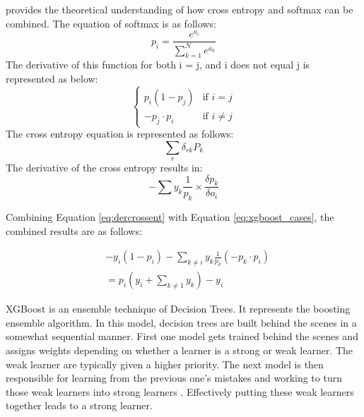\documentclass[stu,12pt,floatsintext]{apa7}
\begin{document}
\textcite{dahal2017softmax} provides the theoretical understanding of how cross entropy and softmax can be combined. The equation  of softmax is as follows:
\[
p_i = \frac{e^{a_i}}{\sum_{k=1}^N e^{a_k}}
\]
The derivative of this function for both i = j, and i does not equal j is represented as below:
\begin{equation}
\begin{cases}
p_i(1-p_j) & \text{if } i = j\\
-p_j \cdot p_i & \text{if } i \ne j
\end{cases}
\label{eq:xgboost_cases}
\end{equation}
The cross entropy equation is represented as follows:
\begin{equation}
\sum_{r} \delta_{rk} P_k
\end{equation}
The derivative of the cross entropy results in:
\begin{equation}
-\sum y_{k}\frac{1}{p_{k}} \times \frac{\delta p_{k}}{\delta o_{i}}
\label{eq:dercrossent}
\end{equation}







Combining Equation \ref{eq:dercrossent} with Equation \ref{eq:xgboost_cases}, the combined results are as follows:

\begin{align}
   & -y_i(1-p_i)-\sum\limits_{k \ne i} y_k \frac{1}{p_k}(-p_k \cdot p_i)\\
   & = p_i\left(y_i + \sum\limits_{k \ne 1} y_k\right) - y_i
\end{align}

















XGBoost is an ensemble technique of Decision Trees. It represents the boosting ensemble algorithm. In this model, decision trees are built behind the scenes in a somewhat sequential manner. First one model gets trained behind the scenes and assigns weights depending on whether a learner is a strong or weak learner. The weak learner are typically given a higher priority. The next model is then responsible for learning from the previous one's mistakes and working to turn those weak learners into strong learners \parencite{wohlwend2023}. Effectively putting these weak learners together leads to a strong learner.
\end{document}
